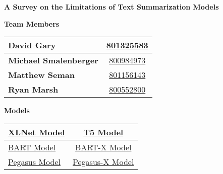 \setlength{\headheight}{15pt}

\vspace{-2pt}

\begin{center}
    \begin{Large}
        \noindent\textbf{A Survey on the Limitations of Text Summarization Models}
    \end{Large}
\end{center}

\vspace{-10pt}

\begin{multicols}{2}

    \begin{center}
        \begin{large}
            \noindent\textbf{Team Members}
        \end{large}
    \end{center}
    \begin{center}
        \begin{tabular}{|lc|}
            \hline
            \textbf{David Gary} & \href{mailto:dgary9@uncc.edu}{801325583} \\ \hline
            \textbf{Michael Smalenberger} & \href{mailto:msmalenb@uncc.edu}{800984973} \\ \hline
            \textbf{Matthew Seman} & \href{mailto:mseman1@uncc.edu}{801156143} \\ \hline
            \textbf{Ryan Marsh} & \href{mailto:rmarsh4@uncc.edu}{800552800} \\ \hline
        \end{tabular}
    \end{center}

    \begin{center}
        \begin{large}
            \noindent\textbf{Models}
        \end{large}
    \end{center}

    \begin{center}
        \begin{tabular}{|lc|}
            \hline
            \href{https://github.com/zihangdai/xlnet}{XLNet Model\cite{XLNet}} & \href{https://huggingface.co/t5-base}{T5 Model\cite{T5}} \\ \hline
            \href{https://huggingface.co/facebook/bart-large-cnn}{BART Model\cite{BART}} &  \href{https://huggingface.co/facebook/bart-large-xsum}{BART-X Model\cite{BART}} \\ \hline
            \href{https://huggingface.co/google/pegasus-large}{Pegasus Model\cite{Pegasus}} &  \href{https://huggingface.co/google/pegasus-xsum}{Pegasus-X Model\cite{PegasusX}} \\ \hline
        \end{tabular}
    \end{center}



\end{multicols}
